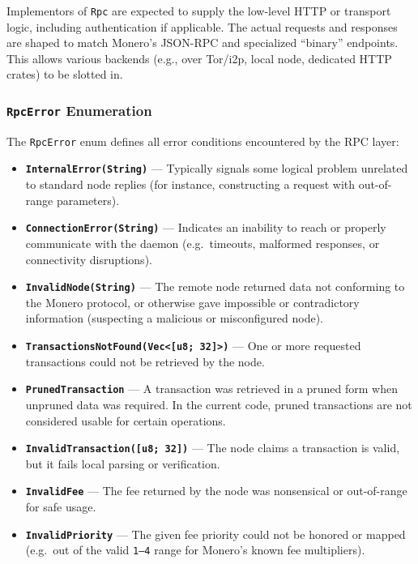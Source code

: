 Implementors of \texttt{Rpc} are expected to supply the low-level HTTP or
transport logic, including authentication if applicable.  The actual requests and
responses are shaped to match Monero’s JSON-RPC and specialized “binary”
endpoints.  This allows various backends (e.g., over Tor/i2p, local node,
dedicated HTTP crates) to be slotted in.

\subsubsection{\texttt{RpcError} Enumeration}
\label{sec:monero-rpc-rpcerror}

The \texttt{RpcError} enum defines all error conditions encountered by the RPC
layer: %

\begin{itemize}
    \item \textbf{\texttt{InternalError(String)}} --- Typically signals some
    logical problem unrelated to standard node replies (for instance,
    constructing a request with out-of-range parameters).

    \item \textbf{\texttt{ConnectionError(String)}} --- Indicates an inability
    to reach or properly communicate with the daemon (e.g.\ timeouts, malformed
    responses, or connectivity disruptions).

    \item \textbf{\texttt{InvalidNode(String)}} --- The remote node returned
    data not conforming to the Monero protocol, or otherwise gave impossible or
    contradictory information (suspecting a malicious or misconfigured node).

    \item \textbf{\texttt{TransactionsNotFound(Vec<[u8; 32]>)}} --- One or more
    requested transactions could not be retrieved by the node.

    \item \textbf{\texttt{PrunedTransaction}} --- A transaction was retrieved in
    a pruned form when unpruned data was required.  In the current code, pruned
    transactions are not considered usable for certain operations.

    \item \textbf{\texttt{InvalidTransaction([u8; 32])}} --- The node claims a
    transaction is valid, but it fails local parsing or verification.

    \item \textbf{\texttt{InvalidFee}} --- The fee returned by the node was
    nonsensical or out-of-range for safe usage.

    \item \textbf{\texttt{InvalidPriority}} --- The given fee priority could not
    be honored or mapped (e.g.\ out of the valid \texttt{1--4} range for
    Monero's known fee multipliers).
\end{itemize}


